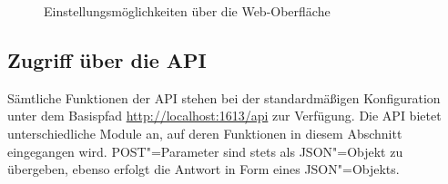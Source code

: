 \begin{figure}
\centering
{}
\qquad
{}
\caption{Einstellungsmöglichkeiten über die Web-Oberfläche}
\label{schlenke:fig:webuiConfig}
\end{figure}

\subsection{Zugriff über die API}
\label{schlenke:chp:api}

Sämtliche Funktionen der API stehen bei der standardmäßigen Konfiguration unter dem Basispfad \url{http://localhost:1613/api} zur Verfügung. Die API bietet unterschiedliche Module an, auf deren Funktionen in diesem Abschnitt eingegangen wird. POST"=Parameter sind stets als JSON"=Objekt zu übergeben, ebenso erfolgt die Antwort in Form eines JSON"=Objekts. 

